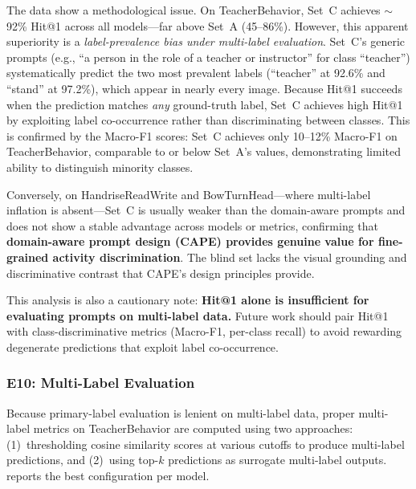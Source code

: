 \documentclass[symmetry,article,submit,pdftex,moreauthors]{Definitions/mdpi}
\begin{document}
The data show a methodological issue. On TeacherBehavior, Set~C achieves $\sim$92\% Hit@1 across all models---far above Set~A (45--86\%). However, this apparent superiority is a \emph{label-prevalence bias under multi-label evaluation}. Set~C's generic prompts (e.g., ``a person in the role of a teacher or instructor'' for class ``teacher'') systematically predict the two most prevalent labels (``teacher'' at 92.6\% and ``stand'' at 97.2\%), which appear in nearly every image. Because Hit@1 succeeds when the prediction matches \emph{any} ground-truth label, Set~C achieves high Hit@1 by exploiting label co-occurrence rather than discriminating between classes. This is confirmed by the Macro-F1 scores: Set~C achieves only 10--12\% Macro-F1 on TeacherBehavior, comparable to or below Set~A's values, demonstrating limited ability to distinguish minority classes.

Conversely, on HandriseReadWrite and BowTurnHead---where multi-label inflation is absent---Set~C is usually weaker than the domain-aware prompts and does not show a stable advantage across models or metrics, confirming that \textbf{domain-aware prompt design (CAPE) provides genuine value for fine-grained activity discrimination}. The blind set lacks the visual grounding and discriminative contrast that CAPE's design principles provide.

This analysis is also a cautionary note: \textbf{Hit@1 alone is insufficient for evaluating prompts on multi-label data.} Future work should pair Hit@1 with class-discriminative metrics (Macro-F1, per-class recall) to avoid rewarding degenerate predictions that exploit label co-occurrence.


\subsubsection{E10: Multi-Label Evaluation}
\label{sec:e10_multilabel}

Because primary-label evaluation is lenient on multi-label data, proper multi-label metrics on TeacherBehavior are computed using two approaches: (1)~thresholding cosine similarity scores at various cutoffs to produce multi-label predictions, and (2)~using top-$k$ predictions as surrogate multi-label outputs.  reports the best configuration per model.
\end{document}
